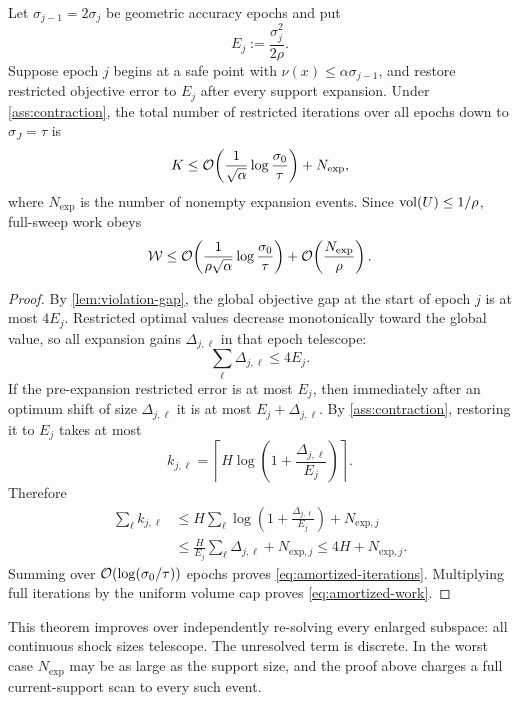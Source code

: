 \begin{theorem}
\label{thm:amortized}
Let $\sigma_{j-1}=2\sigma_j$ be geometric accuracy epochs and put
\begin{equation}
  E_j:=\frac{\sigma_j^2}{2\rho}.
\end{equation}
Suppose epoch $j$ begins at a safe point with
$\nu(x)\leq\alpha\sigma_{j-1}$, and restore restricted objective error to
$E_j$ after every support expansion.  Under \cref{ass:contraction}, the total
number of restricted iterations over all epochs down to $\sigma_J=\tau$ is
\begin{equation}
 K
 \leq\mathcal{O}\!\left(
       \frac1{\sqrt\alpha}\log\frac{\sigma_0}{\tau}
      \right)+N_{\mathrm{exp}},
 \label{eq:amortized-iterations}
\end{equation}
where $N_{\mathrm{exp}}$ is the number of nonempty expansion events.  Since
$\operatorname{vol}(U)\leq1/\rho$, full-sweep work obeys
\begin{equation}
 \mathcal W
 \leq\mathcal{O}\!\left(
       \frac1{\rho\sqrt\alpha}\log\frac{\sigma_0}{\tau}
      \right)
      +\mathcal{O}\!\left(\frac{N_{\mathrm{exp}}}{\rho}\right).
 \label{eq:amortized-work}
\end{equation}
\end{theorem}

\begin{proof}
By \cref{lem:violation-gap}, the global objective gap at the start of epoch
$j$ is at most $4E_j$.  Restricted optimal values decrease monotonically
toward the global value, so all expansion gains $\Delta_{j,\ell}$ in that
epoch telescope:
\begin{equation}
  \sum_\ell\Delta_{j,\ell}\leq4E_j.
  \label{eq:shock-telescope}
\end{equation}
If the pre-expansion restricted error is at most $E_j$, then immediately after
an optimum shift of size $\Delta_{j,\ell}$ it is at most
$E_j+\Delta_{j,\ell}$.  By \cref{ass:contraction}, restoring it to $E_j$
takes at most
\begin{equation}
 k_{j,\ell}
 =\left\lceil H\log\left(1+\frac{\Delta_{j,\ell}}{E_j}\right)\right\rceil.
\end{equation}
Therefore
\begin{align*}
 \sum_\ell k_{j,\ell}
 &\leq H\sum_\ell
       \log\left(1+\frac{\Delta_{j,\ell}}{E_j}\right)
       +N_{\mathrm{exp},j}\\
 &\leq\frac{H}{E_j}\sum_\ell\Delta_{j,\ell}
       +N_{\mathrm{exp},j}
 \leq4H+N_{\mathrm{exp},j}.
\end{align*}
Summing over $\mathcal{O}(\log(\sigma_0/\tau))$ epochs proves
\cref{eq:amortized-iterations}.  Multiplying full iterations by the uniform
volume cap proves \cref{eq:amortized-work}.
\end{proof}

This theorem improves over independently re-solving every enlarged subspace:
all continuous shock sizes telescope.  The unresolved term is discrete.  In
the worst case $N_{\mathrm{exp}}$ may be as large as the support size, and the
proof above charges a full current-support scan to every such event.

